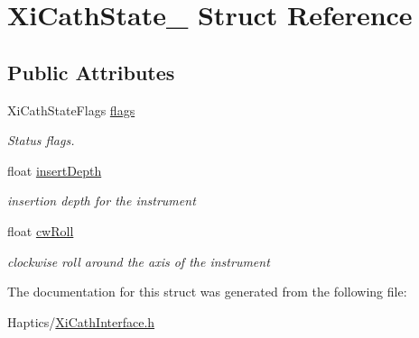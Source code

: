 \hypertarget{structXiCathState__}{
\section{XiCathState\_\- Struct Reference}
\label{structXiCathState__}
}
\subsection*{Public Attributes}
\begin{DoxyCompactItemize}
\item 
\hypertarget{structXiCathState___a0c7049322cb6f5d2c9f0dd78e05b5726}{
XiCathStateFlags \hyperlink{structXiCathState___a0c7049322cb6f5d2c9f0dd78e05b5726}{flags}}
\label{structXiCathState___a0c7049322cb6f5d2c9f0dd78e05b5726}

\begin{DoxyCompactList}\small\item\em Status flags. \item\end{DoxyCompactList}\item 
\hypertarget{structXiCathState___a25582de6ae32629dcf24475fa04308d4}{
float \hyperlink{structXiCathState___a25582de6ae32629dcf24475fa04308d4}{insertDepth}}
\label{structXiCathState___a25582de6ae32629dcf24475fa04308d4}

\begin{DoxyCompactList}\small\item\em insertion depth for the instrument \item\end{DoxyCompactList}\item 
\hypertarget{structXiCathState___aa36411fb63bd439119a7a74ec50f2203}{
float \hyperlink{structXiCathState___aa36411fb63bd439119a7a74ec50f2203}{cwRoll}}
\label{structXiCathState___aa36411fb63bd439119a7a74ec50f2203}

\begin{DoxyCompactList}\small\item\em clockwise roll around the axis of the instrument \item\end{DoxyCompactList}\end{DoxyCompactItemize}


The documentation for this struct was generated from the following file:\begin{DoxyCompactItemize}
\item 
Haptics/\hyperlink{XiCathInterface_8h}{XiCathInterface.h}\end{DoxyCompactItemize}
